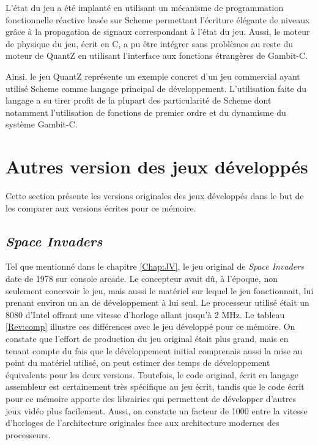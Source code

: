 \documentclass[12pt,twoside,letterpaper,francais]{book}
\begin{document}
L'état du jeu a été implanté en utilisant un mécanisme de
programmation fonctionnelle réactive basée sur Scheme permettant
l'écriture élégante de niveaux grâce à la propagation de signaux
correspondant à l'état du jeu. Aussi, le moteur de physique du jeu,
écrit en C, a pu être intégrer sans problèmes au reste du moteur de
QuantZ en utilisant l'interface aux fonctions étrangères de Gambit-C.

Ainsi, le jeu QuantZ représente un exemple concret d'un jeu commercial
ayant utilisé Scheme comme langage principal de
dévelop\-pement. L'utilisation faite du langage a su tirer profit de la
plupart des particularité de Scheme dont notamment l'utilisation
de fonctions de premier ordre et du dynamisme du système Gambit-C.

\FloatBarrier
\section{Autres version des jeux développés}
\label{Rev:comp-section}

Cette section présente les versions originales des jeux développés
dans le but de les comparer aux versions écrites pour ce mémoire.

\subsection{\textit{Space Invaders}}

Tel que mentionné dans le chapitre \ref{Chap:JV}, le jeu original de
\textit{Space Invaders} date de 1978 sur console arcade.  Le
concepteur avait dû, à l'époque, non seulement concevoir le jeu, mais
aussi le matériel sur lequel le jeu fonctionnait, lui prenant environ
un an de développement à lui seul. Le processeur utilisé était un 8080
d'Intel offrant une vitesse d'horloge allant jusqu'à 2 MHz. Le tableau
\ref{Rev:comp} illustre ces différences avec le jeu développé pour
ce mémoire. On constate que l'effort de production du jeu original
était plus grand, mais en tenant compte du fais que le développement
initial comprenais aussi la mise au point du matériel utilisé, on peut
estimer des temps de développement équivalents pour les deux
versions. Toutefois, le code original, écrit en langage assembleur est
certainement très spécifique au jeu écrit, tandis que le code écrit
pour ce mémoire apporte des librairies qui permettent de développer
d'autres jeux vidéo plus facilement. Aussi, on constate un facteur de
1000 entre la vitesse d'horloges de l'architecture originales face aux
architecture modernes des processeurs.
\end{document}

